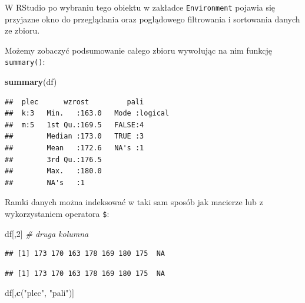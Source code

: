 \documentclass[]{book}
\newenvironment{Shaded}{\begin{snugshade}}{\end{snugshade}}
\newcommand{\KeywordTok}[1]{\textcolor[rgb]{0.13,0.29,0.53}{\textbf{#1}}}
\newcommand{\DecValTok}[1]{\textcolor[rgb]{0.00,0.00,0.81}{#1}}
\newcommand{\StringTok}[1]{\textcolor[rgb]{0.31,0.60,0.02}{#1}}
\newcommand{\CommentTok}[1]{\textcolor[rgb]{0.56,0.35,0.01}{\textit{#1}}}
\newcommand{\OperatorTok}[1]{\textcolor[rgb]{0.81,0.36,0.00}{\textbf{#1}}}
\newcommand{\NormalTok}[1]{#1}
\begin{document}
W RStudio po wybraniu tego obiektu w zakładce \texttt{Environment}
pojawia się przyjazne okno do przeglądania oraz poglądowego filtrowania
i sortowania danych ze zbioru.

Możemy zobaczyć podsumowanie całego zbioru wywołując na nim funkcję
\texttt{summary()}:

\begin{Shaded}
\begin{Highlighting}[]
\KeywordTok{summary}\NormalTok{(df)}
\end{Highlighting}
\end{Shaded}

\begin{verbatim}
##  plec      wzrost         pali        
##  k:3   Min.   :163.0   Mode :logical  
##  m:5   1st Qu.:169.5   FALSE:4        
##        Median :173.0   TRUE :3        
##        Mean   :172.6   NA's :1        
##        3rd Qu.:176.5                  
##        Max.   :180.0                  
##        NA's   :1
\end{verbatim}

Ramki danych można indeksować w taki sam sposób jak macierze lub z
wykorzystaniem operatora \texttt{\$}:

\begin{Shaded}
\begin{Highlighting}[]
\NormalTok{df[,}\DecValTok{2}\NormalTok{] }\CommentTok{# druga kolumna}
\end{Highlighting}
\end{Shaded}

\begin{verbatim}
## [1] 173 170 163 178 169 180 175  NA
\end{verbatim}

\begin{Shaded}
\end{Shaded}

\begin{verbatim}
## [1] 173 170 163 178 169 180 175  NA
\end{verbatim}

\begin{Shaded}
\begin{Highlighting}[]
\NormalTok{df[,}\KeywordTok{c}\NormalTok{(}\StringTok{"plec"}\NormalTok{, }\StringTok{"pali"}\NormalTok{)]}
\end{Highlighting}
\end{Shaded}
\end{document}
